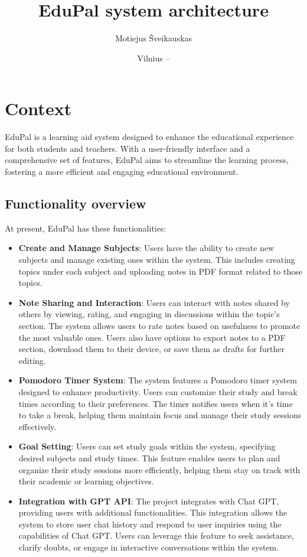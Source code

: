 \documentclass[
    english, %
]{VUMIFPSkursinis}
\title{EduPal system architecture}
\author{Motiejus Šveikauskas}
\date{Vilnius – \the\year}
\begin{document}
\maketitle

\tableofcontents

\section{Context}
EduPal is a learning aid system designed to enhance
the educational experience for both students and teachers. With a user-friendly interface and a comprehensive set of features, EduPal aims to streamline the learning process, fostering a more efficient and engaging educational environment.

\subsection{Functionality overview}

At present, EduPal has these functionalities:

\begin{itemize}
    \item \textbf{Create and Manage Subjects}: Users have the ability to create new subjects and manage existing ones within the system. This includes creating topics under each subject and uploading notes in PDF format related to those topics.
    \item \textbf{Note Sharing and Interaction}: Users can interact with notes shared by others by viewing, rating, and engaging in discussions within the topic's section. The system allows users to rate notes based on usefulness to promote the most valuable ones. Users also have options to export notes to a PDF section, download them to their device, or save them as drafts for further editing. 
    \item \textbf{Pomodoro Timer System}: The system features a Pomodoro timer system designed to enhance productivity. Users can customize their study and break times according to their preferences. The timer notifies users when it's time to take a break, helping them maintain focus and manage their study sessions effectively.
    \item \textbf{Goal Setting}: Users can set study goals within the system, specifying desired subjects and study times. This feature enables users to plan and organize their study sessions more efficiently, helping them stay on track with their academic or learning objectives.
    \item \textbf{Integration with GPT API}: The project integrates with Chat GPT, providing users with additional functionalities. This integration allows the system to store user chat history and respond to user inquiries using the capabilities of Chat GPT. Users can leverage this feature to seek assistance, clarify doubts, or engage in interactive conversations within the system.
    \end{itemize}
\end{document}
